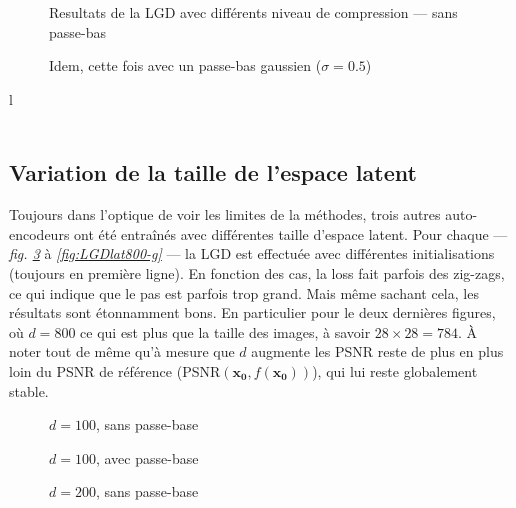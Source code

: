 \documentclass[hidelinks, french]{article} %
\renewcommand{\bf}[1]{\boldsymbol{#1}}
\theoremstyle{enonce}
\theoremstyle{special}
\theoremstyle{rq}
\theoremstyle{exo}
\theoremstyle{demo}
\begin{document}
\begin{figure}[H]\centering
	
	\caption{Resultats de la LGD avec différents niveau de compression --- sans passe-bas}
	\label{fig:LGDsizes-s}
\end{figure}

\begin{figure}[H]\centering
	
	\caption{Idem, cette fois avec un passe-bas gaussien ($\sigma=0.5$)}
	\label{fig:LGDsizes-g}
\end{figure}
{\color{white}l}
\\ \\



\subsection{Variation de la taille de l'espace latent}\label{sec:LGDlat}

Toujours dans l'optique de voir les limites de la méthodes, trois autres auto-encodeurs ont été entraînés avec différentes taille d'espace latent. Pour chaque --- \textit{fig. \ref{fig:LGDlat100-s}} à \textit{ \ref{fig:LGDlat800-g}} --- la LGD est effectuée avec différentes initialisations (toujours en première ligne). En fonction des cas, la loss fait parfois des zig-zags, ce qui indique que le pas est parfois trop grand. Mais même sachant cela, les résultats sont étonnamment bons. En particulier pour le deux dernières figures, où $d=800$ ce qui est plus que la taille des images, à savoir $28\times28=784$. \`A noter tout de même qu'à mesure que $d$ augmente les PSNR reste de plus en plus loin du PSNR de référence (PSNR$(\bf{x_0}, f(\bf{x_0}))$), qui lui reste globalement stable.
\\

\newpage

\begin{figure}[H]\centering
    
    \caption{$d=100$, sans passe-base}
    \label{fig:LGDlat100-s}
\end{figure}

\begin{figure}[H]\centering
	
	\caption{$d=100$, avec passe-base}
	\label{fig:LGDlat100-g}
\end{figure}

\begin{figure}[H]\centering
	
	\caption{$d=200$, sans passe-base}
	\label{fig:LGDlat200-s}
\end{figure}
\end{document}
